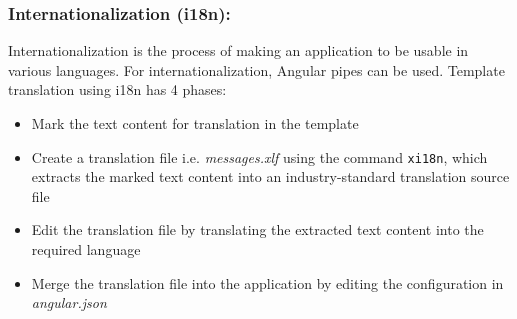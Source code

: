 \documentclass{report}
\begin{document}
\subsubsection*{Internationalization (i18n):}
Internationalization is the process of making an application to be usable in various languages. For internationalization, Angular pipes can be used.
Template translation using i18n has 4 phases:
\begin{itemize}
	\item{Mark the text content for translation in the template}
	\item{Create a translation file i.e. \textit{messages.xlf} using the command \lstinline{xi18n}, which extracts the marked text content into an industry-standard translation source file}
	\item{Edit the translation file by translating the extracted text content into the required language}
	\item{Merge the translation file into the application by editing the configuration in \textit{angular.json}}
\end{itemize}
\end{document}
